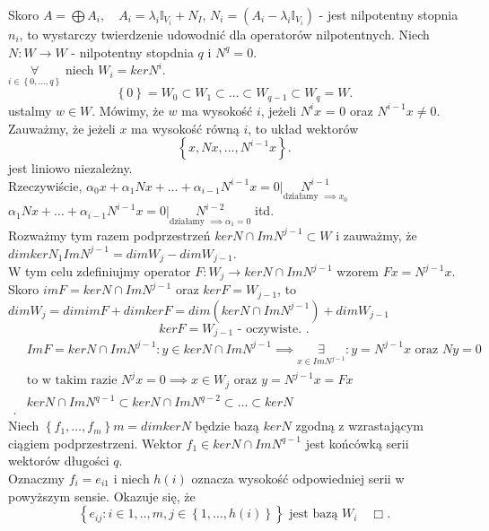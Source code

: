 \documentclass[../main.tex]{subfiles}
\begin{document}
\begin{dowod}
    Skoro $A = \bigoplus A_i,\quad A_i = \lambda_i \mathbb{I}_{V_i}+N_I$, $N_i = (A_i - \lambda_i \mathbb{I}_{V_i})$ - jest nilpotentny stopnia $n_i$, to wystarczy twierdzenie udowodnić dla operatorów nilpotentnych. Niech $N: W\to W$ - nilpotentny stopdnia $q$ i $N^q = 0$.\\
    $\underset{i\in \left\{ 0,\ldots,q \right\} }{\forall} $ niech $W_i = ker N^i$.\\
    \[
        \left\{ 0 \right\} = W_0 \subset W_1 \subset \ldots \subset W_{q-1} \subset W_q = W
    .\]
    ustalmy $w\in W$. Mówimy, że $w$ ma wysokość $i$, jeżeli $N^ix$ = 0 oraz $N^{i-1}x \neq 0$.\\
    Zauważmy, że jeżeli $x$ ma wysokość równą $i$, to układ wektorów \[
        \left\{ x,Nx,\ldots,N^{i-1}x \right\}
    .\] jest liniowo niezależny.\\
    Rzeczywiście, $\alpha_0x+\alpha_1Nx + \ldots + \alpha_{i-1}N^{i-1}x = 0 |\underset{\text{działamy }\implies x_0}{N^{i-1}}$\\
    $\alpha_1Nx + \ldots + \alpha_{i-1}N^{i-1}x = 0 |\underset{\text{działamy }\implies\alpha_1 = 0}{N^{i-2}}$ itd.\\
    Rozważmy tym razem podprzestrzeń $ker N \cap Im N^{j-1} \subset W$ i zauważmy, że $dim ker N_1 Im N^{j-1} = dim W_j - dim W_{j-1}$.\\
W tym celu zdefiniujmy operator $F: W_j \to ker N \cap Im N^{j-1}$ wzorem $F x = N^{j-1}x$.\\
Skoro $im F = ker N \cap Im N^{j-1}$ oraz $ker F = W_{j-1}$, to \\
$dim W_j = dim im F + dim ker F = dim (ker N\cap Im N^{j-1}) + dim W_{j-1}$\\
 \[
     ker F = W_{j-1} \text{ - oczywiste. }
.\]
\begin{align*}
    &Im F = ker N \cap Im N^{j-1}: y\in ker N \cap Im N^{j-1} \implies \underset{x\in Im N^{j-1}}{\exists} : y = N^{j-1}x \text{ oraz } Ny = 0\\
    &\text{to w takim razie } N^{j}x = 0\implies x\in W_j \text{ oraz } y = N^{j-1}x = Fx\\
    &ker N \cap Im N^{q-1}\subset ker N \cap Im N^{q-2}\subset \ldots \subset ker N\\
.\end{align*}
Niech $\left\{ f_1,\ldots,f_m \right\} m=dim ker N$ będzie bazą $ker N$ zgodną z wzrastającym ciągiem podprzestrzeni. Wektor $f_1\in ker N\cap Im N^{q-1}$ jest końcówką serii wektorów długości $q$.\\
Oznaczmy $f_i=e_{i1}$ i niech $h(i)$ oznacza wysokość odpowiedniej serii w powyższym sensie. Okazuje się, że
\[
    \left\{ e_{ij}: i\in 1,..,m, j\in\left\{ 1,\ldots,h(i) \right\}  \right\} \text{ jest bazą }W_i \quad\Box
.\]
\end{dowod}
\end{document}
